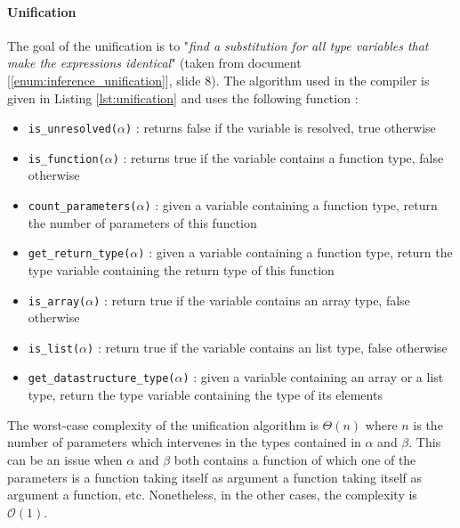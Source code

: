 \documentclass[a4paper,11pt]{article}
\begin{document}
\paragraph{Unification} The goal of the unification is to "\textit{find a substitution for all type variables that make the expressions identical}" (taken from document [\ref{enum:inference_unification}], slide 8). The algorithm used in the compiler is given in Listing \ref{lst:unification} and uses the following function : 

\begin{itemize}
	\item \texttt{is\_unresolved($\alpha$)} : returns false if the variable is resolved, true otherwise 
	\item \texttt{is\_function($\alpha$)} : returns true if the variable contains a function type, false otherwise
	\item \texttt{count\_parameters($\alpha$)} : given a variable containing a function type, return the number of parameters of this function 
	\item \texttt{get\_return\_type($\alpha$)} : given a variable containing a function type, return the type variable containing the return type of this function
	\item \texttt{is\_array($\alpha$)} : return true if the variable contains an array type, false otherwise
	\item \texttt{is\_list($\alpha$)} : return true if the variable contains an list type, false otherwise 
	\item \texttt{get\_datastructure\_type($\alpha$)} : given a variable containing an array or a list type, return the type variable containing the type of its elements
\end{itemize}
The worst-case complexity of the unification algorithm is $\Theta(n)$ where $n$ is the number of parameters which intervenes in the types contained in $\alpha$ and $\beta$. This can be an issue when $\alpha$ and $\beta$ both contains a function of which one of the parameters is a function taking itself as argument a function taking itself as argument a function, etc. Nonetheless, in the other cases, the complexity is $\mathcal{O}(1)$.
\end{document}
